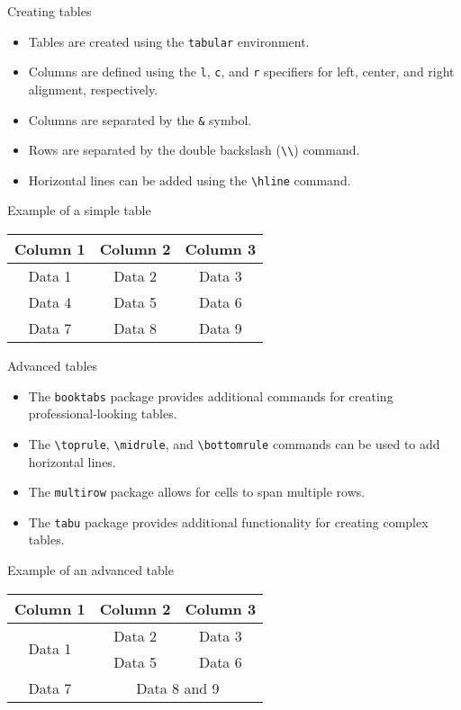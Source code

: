\documentclass[t,12pt,xcolor=dvipsnames]{beamer}
\begin{document}
\begin{frame}{Creating tables}
    \begin{itemize}
        \item Tables are created using the \texttt{tabular} environment.
        \item Columns are defined using the \texttt{l}, \texttt{c}, and \texttt{r} specifiers for left, center, and right alignment, respectively.
        \item Columns are separated by the \texttt{\&} symbol.
        \item Rows are separated by the double backslash (\texttt{\textbackslash\textbackslash}) command.
        \item Horizontal lines can be added using the \texttt{\textbackslash hline} command.
    \end{itemize}
\end{frame}

\begin{frame}{Example of a simple table}
    \centering
    \begin{tabular}{|c|c|c|}
        \hline
        Column 1 & Column 2 & Column 3 \\
        \hline
        Data 1 & Data 2 & Data 3 \\
        Data 4 & Data 5 & Data 6 \\
        Data 7 & Data 8 & Data 9 \\
        \hline
    \end{tabular}
\end{frame}

\begin{frame}{Advanced tables}
    \begin{itemize}
        \item The \texttt{booktabs} package provides additional commands for creating professional-looking tables.
        \item The \texttt{\textbackslash toprule}, \texttt{\textbackslash midrule}, and \texttt{\textbackslash bottomrule} commands can be used to add horizontal lines.
        \item The \texttt{multirow} package allows for cells to span multiple rows.
        \item The \texttt{tabu} package provides additional functionality for creating complex tables.
    \end{itemize}
\end{frame}

\begin{frame}{Example of an advanced table}
    \centering
    \begin{tabular}{|c|c|c|}
        \toprule
        Column 1 & Column 2 & Column 3 \\
        \midrule
        \multirow{2}{*}{Data 1} & Data 2 & Data 3 \\
        & Data 5 & Data 6 \\
        Data 7 & \multicolumn{2}{c|}{Data 8 and 9} \\
        \bottomrule
    \end{tabular}
\end{frame}
\end{document}

